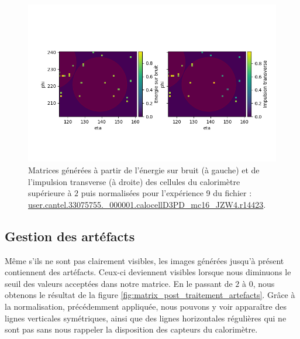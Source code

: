 \begin{figure}[hbt!]
    \centering
    \includegraphics[scale=0.7]{Figures/dataset/matrix_post_energy_over_noise_normalized_not_all_jets_visible_e_o_n_and_pt.png}
    \caption{Matrices générées à partir de l'énergie sur bruit (à gauche) et de l'impulsion transverse (à droite) des cellules du calorimètre supérieure à $2$ puis normalisées pour l'expérience 9 du fichier : \url{user.cantel.33075755.\_000001.calocellD3PD\_mc16\_JZW4.r14423}.}
    \label{fig:matrix_post_energy_over_noise_normalized_not_all_jets_visible_e_o_n_and_pt}
\end{figure}

\break

\subsection{Gestion des artéfacts}

Même s'ils ne sont pas clairement visibles, les images générées jusqu'à présent contiennent des artéfacts. Ceux-ci deviennent visibles lorsque nous diminuons le seuil des valeurs acceptées dans notre matrice. En le passant de $2$ à $0$, nous obtenons le résultat de la figure \ref{fig:matrix_post_traitement_artefacts}. Grâce à la normalisation, précédemment appliquée, nous pouvons y voir apparaître des lignes verticales symétriques, ainsi que des lignes horizontales régulières qui ne sont pas sans nous rappeler la disposition des capteurs du calorimètre.


